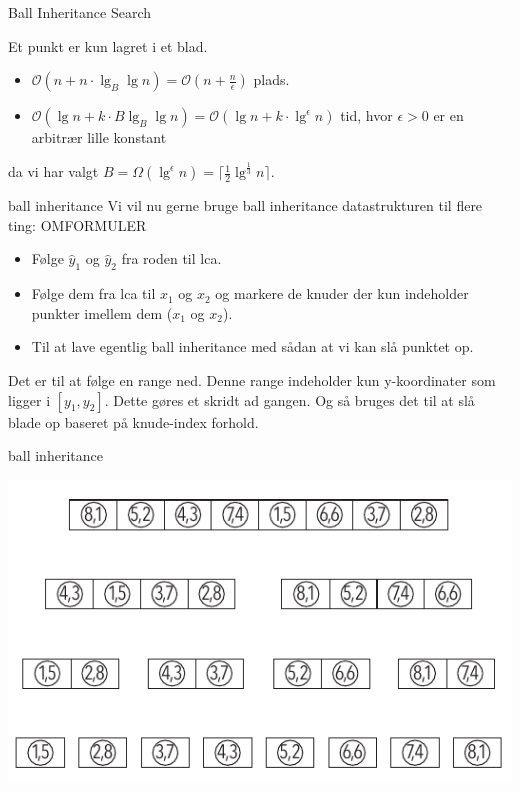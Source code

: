 \documentclass[pdf]{beamer}
\begin{document}
\begin{frame}{Ball Inheritance Search}

  Et punkt er kun lagret i et blad.
  \pause

  \begin{itemize}
    \item $\mathcal{O}(n + n\cdot\lg_B\lg n) = \mathcal{O}(n + \frac{n}{\epsilon})$ plads.
    \item $\mathcal{O}(\lg n + k\cdot B\lg_B\lg n) = \mathcal{O}(\lg n + k\cdot\lg^\epsilon n)$ tid, hvor $\epsilon > 0$ er en arbitrær lille konstant
  \end{itemize}
    da vi har valgt $B = \Omega(\lg^\epsilon n) = \lceil \frac{1}{2}\lg^\frac{1}{3} n \rceil$.
\end{frame}

\begin{frame}{ball inheritance}
  Vi vil nu gerne bruge ball inheritance datastrukturen til flere ting: OMFORMULER
  \begin{itemize}
    \item Følge $\hat{y}_1$ og $\hat{y}_2$ fra roden til lca.
    \item Følge dem fra lca til $x_1$ og $x_2$ og markere de knuder der kun indeholder punkter imellem dem ($x_1$ og $x_2$).
    \item Til at lave egentlig ball inheritance med sådan at vi kan slå punktet op.
  \end{itemize}

  Det er til at følge en range ned. Denne range indeholder kun y-koordinater som ligger i $[y_1, y_2]$. Dette gøres et skridt ad gangen. Og så bruges det til at slå blade op baseret på knude-index forhold.
\end{frame}

\begin{frame}{ball inheritance}
  \begin{center}
    \includegraphics[scale=1.0]{pictures/bolde_med_to_tal.pdf}
  \end{center}
\end{frame}
\end{document}
